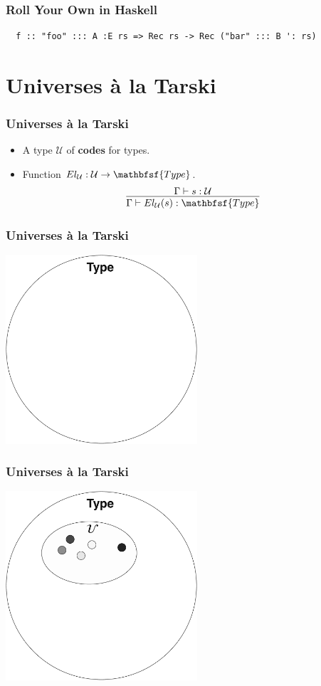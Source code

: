 \documentclass[tikz, 12pt]{beamer}
\def\Type{\mathbfsf{Type}}
\begin{document}
\begin{frame}[fragile]
  \frametitle{Roll Your Own in Haskell}\pause
  \begin{lstlisting}
  f :: "foo" ::: A :E rs => Rec rs -> Rec ("bar" ::: B ': rs)
  \end{lstlisting}
\end{frame}

\section{Universes \`a la Tarski}

\begin{frame}
  \frametitle{Universes \`a la Tarski}\pause
  \begin{itemize}
    \item A type $\mathcal{U}$ of \textbf{codes} for types.
      \pause
    \item Function $El_\mathcal{U} : \mathcal{U}\to\Type$.
      \pause
      \[
        \infer{
          \Gamma\vdash El_\mathcal{U}(s) : \Type
        }{
          \Gamma\vdash s : \mathcal{U}
        }
      \]
  \end{itemize}
\end{frame}

\begin{frame}
  \frametitle{Universes \`a la Tarski}
  \begin{center}
    \includegraphics[width=2.8in]{universe-empty.pdf}
  \end{center}
\end{frame}

\begin{frame}
  \frametitle{Universes \`a la Tarski}
  \begin{center}
    \includegraphics[width=2.8in]{universe-embedded.pdf}
  \end{center}
\end{frame}
\end{document}
